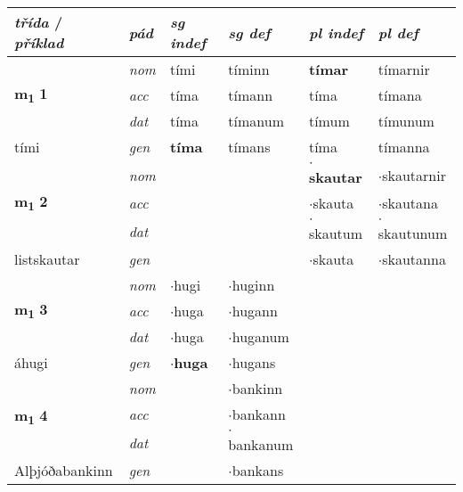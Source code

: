 
\begin{longtable}[l]{llllll} \toprule
 {\textbf{\textit{třída}} / \textit{příklad}}  &  {\textit{pád}}  & {\textit{sg indef}}  & {\textit{sg def}}    & {\textit{pl indef}} & {\textit{pl def}}\\ \cmidrule{1-6}
\endhead
\multirow{3}{*}{{{\textbf{m{\textsubscript{1}}} \Large{\textbf{1}}}}}  & {\footnotesize{{\textit{nom}}}} & tími & tíminn    & \textbf{tímar} & tímarnir  \\*
 &  {\footnotesize{{\textit{acc}}}} & tíma  & tímann   & tíma  & tímana \\*
 &  {\footnotesize{{\textit{dat}}}} & tíma & tímanum   & tímum & tímunum \\*
 {\footnotesize{tími}} &   {\footnotesize{{\textit{gen}}}} & \textbf{tíma}  & tímans  & tíma & tímanna \\
\cmidrule{1-6}


\multirow{3}{*}{{{\textbf{m{\textsubscript{1}}} \Large{\textbf{2}}}}}  & {\footnotesize{{\textit{nom}}}} &  &     & \textbf{$\cdot$skautar} & $\cdot$skautarnir  \\*
 &  {\footnotesize{{\textit{acc}}}} &   &    & $\cdot$skauta  & $\cdot$skautana \\*
 &  {\footnotesize{{\textit{dat}}}} &  &    & $\cdot$skautum & $\cdot$skautunum \\*
 {\footnotesize{listskautar}} &   {\footnotesize{{\textit{gen}}}} & \textbf{}  &   & $\cdot$skauta & $\cdot$skautanna \\
\cmidrule{1-6}


\multirow{3}{*}{{{\textbf{m{\textsubscript{1}}} \Large{\textbf{3}}}}}  & {\footnotesize{{\textit{nom}}}} & $\cdot$hugi & $\cdot$huginn    & \textbf{} &   \\*
 &  {\footnotesize{{\textit{acc}}}} & $\cdot$huga  & $\cdot$hugann   &   &  \\*
 &  {\footnotesize{{\textit{dat}}}} & $\cdot$huga & $\cdot$huganum   &  &  \\*
 {\footnotesize{áhugi}} &   {\footnotesize{{\textit{gen}}}} & \textbf{$\cdot$huga}  & $\cdot$hugans  &  &  \\
\cmidrule{1-6}


\multirow{3}{*}{{{\textbf{m{\textsubscript{1}}} \Large{\textbf{4}}}}}  & {\footnotesize{{\textit{nom}}}} &  & $\cdot$bankinn    & \textbf{} &   \\*
 &  {\footnotesize{{\textit{acc}}}} &   & $\cdot$bankann   &   &  \\*
 &  {\footnotesize{{\textit{dat}}}} &  & $\cdot$bankanum   &  &  \\*
 {\footnotesize{Alþjóðabankinn}} &   {\footnotesize{{\textit{gen}}}} & \textbf{}  & $\cdot$bankans  &  &  \\
\cmidrule{1-6}



\end{longtable}
